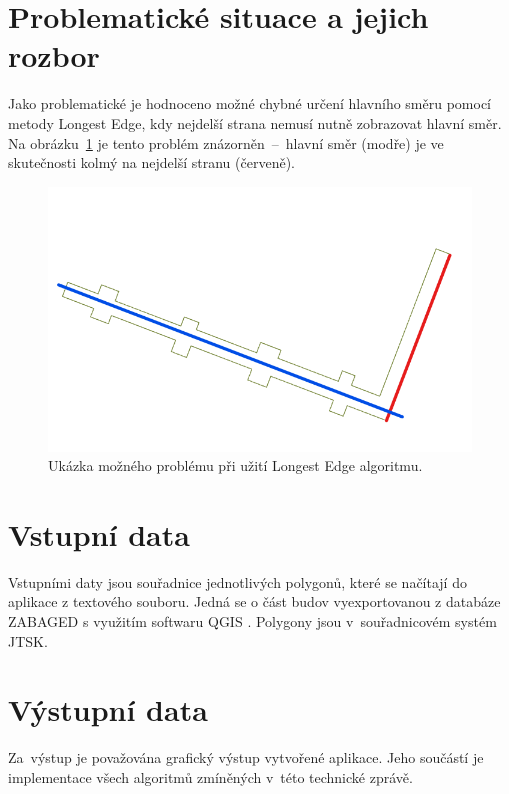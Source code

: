 \documentclass[a4paper, 12pt, oneside, titlepage]{article} %
\begin{document}
\section{Problematické situace a jejich rozbor} \label{problemrozbor}
Jako problematické je hodnoceno možné chybné určení hlavního směru pomocí metody Longest Edge, kdy nejdelší strana nemusí nutně zobrazovat hlavní směr. Na obrázku~\ref{fig:lon_edge_problem} je tento problém znázorněn~--~hlavní směr (modře) je ve skutečnosti kolmý na nejdelší stranu (červeně).

\begin{figure}[!htb]
	\centering
	\includegraphics[scale=0.6]{obrazky/lon_edge_problem.png} 
	\caption{Ukázka možného problému při užití Longest Edge algoritmu.
	}
	\label{fig:lon_edge_problem}
\end{figure} 
\FloatBarrier

\section{Vstupní data}
Vstupními daty jsou souřadnice jednotlivých polygonů, které se načítají do aplikace z textového souboru. Jedná se o část budov vyexportovanou z databáze ZABAGED \cite{ZABAGED} s využitím softwaru QGIS \cite{qgis}. Polygony jsou v~souřadnicovém systém JTSK.


\section{Výstupní data}
Za~výstup je považována grafický výstup vytvořené aplikace. Jeho součástí je implementace všech algoritmů zmíněných v~této technické zprávě. 
\end{document}
